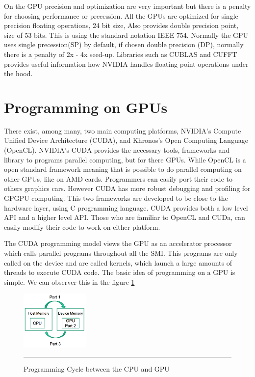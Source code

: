 On the GPU precision and optimization are very important but there is a penalty for choosing performance or precession. All the GPUs are optimized for single precision floating operations, 24 bit size, Also provides double precision point, size of  53 bits. This is using the standard notation IEEE 754. Normally the GPU uses single precession(SP) by default, if chosen double precision (DP), normally there is a penalty of  2x - 4x seed-up. \cite{precision}
Libraries such as CUBLAS and CUFFT provides useful information how NVIDIA handles floating point operations under the hood.


\section{Programming on GPUs}

There exist, among many, two main computing platforms, NVIDIA's Compute Unified Device Architecture (CUDA), and Khronos's Open Computing Language (OpenCL). NVIDIA's CUDA provides the necessary tools, frameworks and library to programs parallel computing, but for there GPUs. While OpenCL is a open standard framework meaning that is possible to do parallel computing on other GPUs, like on AMD cards. Programmers can easily port their code to others graphics cars.  However CUDA has more robust debugging and profiling for GPGPU computing. This two frameworks are developed to be close to the hardware layer, using C programming language. CUDA provides both a low level API and a higher level API. Those who are familiar to OpenCL and CUDa, can easily modify their code to work on either platform.\cite{hwu}


The CUDA programming model views the GPU as an accelerator processor which calls parallel programs  throughout all the SMI. This programs are only called on the device and are called kernels, which launch a large amounts of threads to execute CUDA code. The basic idea of programming on a GPU is simple. We can observer this in the figure \ref{fig:cycle}

\begin{figure}[htbp]
	\centering
		\includegraphics[width=0.3\textwidth]{Figures/cycle.png}
		\rule{35em}{0.5pt}
	\caption[Programming Cycle]{Programming Cycle between the CPU and GPU}
	\label{fig:cycle}
\end{figure}


